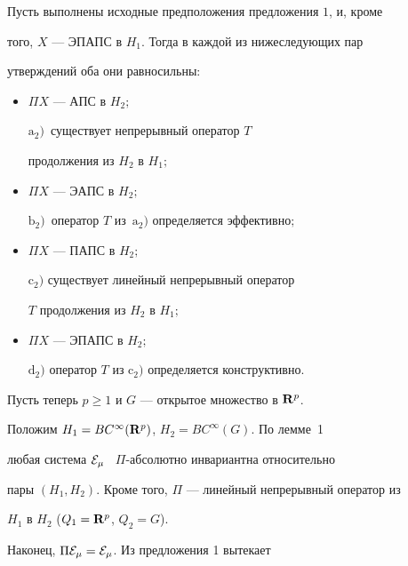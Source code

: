 \begin{prop}


Пусть выполнены исходные предположения предложения $1$, и, кроме


того, $X$ --- ЭПАПС в $H_1$. Тогда в каждой из нижеследующих пар


утверждений оба они равносильны\/${:}$


\begin{itemize}


\item[$\mathrm a_1)$] $\Pi X$ --- АПС в $H_2;$


$\mathrm a_2)$~существует непрерывный оператор $T$


продолжения из $H_2$ в $H_1;$


\item[$\mathrm b_1)$] $\Pi X$ --- ЭАПС в $H_2;$


$\mathrm b_2)$~оператор $T$ из~$\mathrm a_2)$ определяется эффективно\/$;$


\item[$\mathrm c_1)$] $\Pi X$ --- ПАПС в $H_2;$


$\mathrm c_2)$ существует линейный непрерывный оператор


$T$ продолжения из $H_2$ в $H_1;$


\item[$\mathrm d_1)$] $\Pi X$ --- ЭПАПС в $H_2;$


$\mathrm d_2)$ оператор $T$ из $\mathrm c_2)$ определяется конструктивно.


\end{itemize}


\end{prop}





Пусть теперь $p\geqslant 1$ и $G$ --- открытое множество в ${\bold R}^p$.


Положим $H_1=BC^{\infty}({\bold R}^p)$, $H_2=BC^{\infty}(G)$. По лемме~1


любая система $\cal{E}_{\mu}$ \ $\Pi$-абсолютно инвариантна относительно


пары $(H_1,H_2)$. Кроме того, $\Pi$ --- линейный непрерывный оператор из


$H_1$ в $H_2$ ($Q_1={\bold R}^p$, $Q_2=G$).


Наконец, $\Pi\cal{E}_{\mu}=\cal{E}_{\mu}$. Из предложения 1 вытекает








